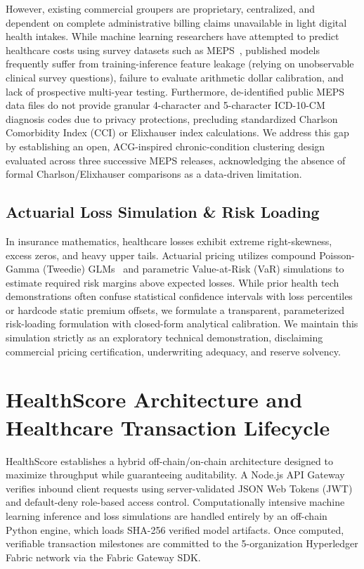 \documentclass[runningheads]{llncs}
\begin{document}
However, existing commercial groupers are proprietary, centralized, and dependent on complete administrative billing claims unavailable in light digital health intakes. While machine learning researchers have attempted to predict healthcare costs using survey datasets such as MEPS~\cite{ahrq_meps_2023}, published models frequently suffer from training-inference feature leakage (relying on unobservable clinical survey questions), failure to evaluate arithmetic dollar calibration, and lack of prospective multi-year testing. Furthermore, de-identified public MEPS data files do not provide granular 4-character and 5-character ICD-10-CM diagnosis codes due to privacy protections, precluding standardized Charlson Comorbidity Index (CCI) or Elixhauser index calculations. We address this gap by establishing an open, ACG-inspired chronic-condition clustering design evaluated across three successive MEPS releases, acknowledging the absence of formal Charlson/Elixhauser comparisons as a data-driven limitation.

\subsection{Actuarial Loss Simulation \& Risk Loading}
In insurance mathematics, healthcare losses exhibit extreme right-skewness, excess zeros, and heavy upper tails. Actuarial pricing utilizes compound Poisson-Gamma (Tweedie) GLMs~\cite{tweedie1984index} and parametric Value-at-Risk (VaR) simulations to estimate required risk margins above expected losses. While prior health tech demonstrations often confuse statistical confidence intervals with loss percentiles or hardcode static premium offsets, we formulate a transparent, parameterized risk-loading formulation with closed-form analytical calibration. We maintain this simulation strictly as an exploratory technical demonstration, disclaiming commercial pricing certification, underwriting adequacy, and reserve solvency.

\section{HealthScore Architecture and Healthcare Transaction Lifecycle}
HealthScore establishes a hybrid off-chain/on-chain architecture designed to maximize throughput while guaranteeing auditability. A Node.js API Gateway verifies inbound client requests using server-validated JSON Web Tokens (JWT) and default-deny role-based access control. Computationally intensive machine learning inference and loss simulations are handled entirely by an off-chain Python engine, which loads SHA-256 verified model artifacts. Once computed, verifiable transaction milestones are committed to the 5-organization Hyperledger Fabric network via the Fabric Gateway SDK.
\end{document}
